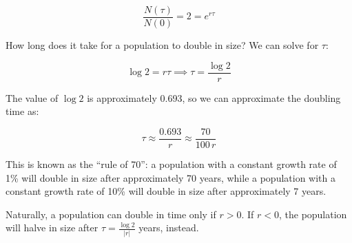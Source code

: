 \documentclass[
  letterpaper,
]{scrbook}
\begin{document}
\[
\dfrac{N(\tau)}{N(0)} = 2 = e^{r\tau}
\]

How long does it take for a population to double in size? We can solve
for \(\tau\):

\[
\log 2 = r \tau \implies \tau = \frac{\log 2}{r}
\]

The value of \(\log 2\) is approximately 0.693, so we can approximate
the doubling time as:

\[
\tau \approx \frac{0.693}{r} \approx \frac{70}{100 \, r}
\]

This is known as the ``rule of 70'': a population with a constant growth
rate of 1\% will double in size after approximately 70 years, while a
population with a constant growth rate of 10\% will double in size after
approximately 7 years.

Naturally, a population can double in time only if \(r>0\). If \(r<0\),
the population will halve in size after \(\tau = \frac{\log 2}{|r|}\)
years, instead.
\end{document}
